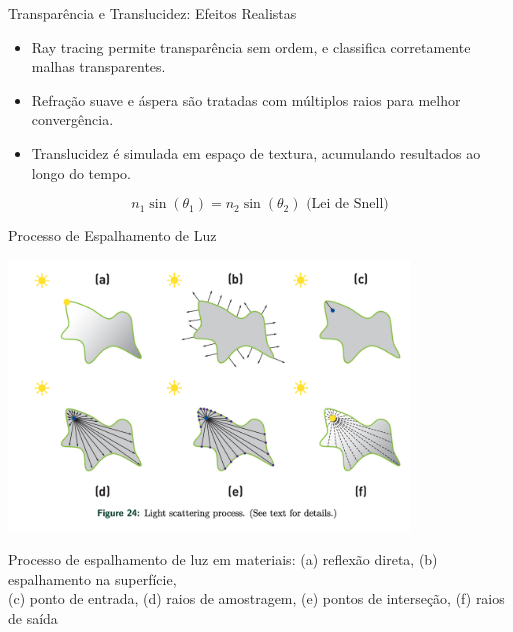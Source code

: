 \documentclass[aspectratio=169,xcolor=table]{beamer}
\begin{document}
\begin{frame}{Transparência e Translucidez: Efeitos Realistas}
    \begin{itemize}
        \item Ray tracing permite transparência sem ordem, e classifica corretamente malhas transparentes.
        \item Refração suave e áspera são tratadas com múltiplos raios para melhor convergência.
        \item Translucidez é simulada em espaço de textura, acumulando resultados ao longo do tempo.
    \end{itemize}
    \begin{equation*}
        n_1 \sin(\theta_1) = n_2 \sin(\theta_2) \text{ (Lei de Snell)}
    \end{equation*}
\end{frame}

\begin{frame}{Processo de Espalhamento de Luz}
    \begin{center}
        \includegraphics[width=0.8\textwidth]{light-scattering-process}
    \end{center}
    \begin{center}
        \small{Processo de espalhamento de luz em materiais: (a) reflexão direta, (b) espalhamento na superfície,\\
        (c) ponto de entrada, (d) raios de amostragem, (e) pontos de interseção, (f) raios de saída}
    \end{center}
\end{frame}
\end{document}
